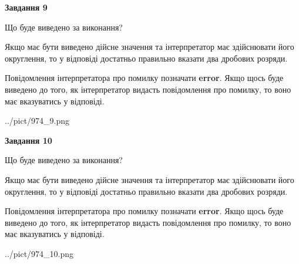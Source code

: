 \documentclass[12pt, ukrainian]{article}
\begin{document}
{\begin {Large}
{\begin {center}\textbf{Завдання 9}\end {center}}\par
Що буде виведено за виконання? \par

Якщо має бути виведено дійсне значення та інтерпретатор має здійснювати його округлення, 
то у відповіді достатньо правильно вказати два дробових розряди.

Повідомлення інтерпретатора про помилку позначати \textbf{error}.
Якщо щось буде виведено до того, як інтерпретатор видасть повідомлення про помилку, 
то воно має вказуватись у відповіді. \par

\begin{center}
	{../pict/974_9.png}
\end{center}
\newpage

{\begin {center}\textbf{Завдання 10}\end {center}}\par
Що буде виведено за виконання? \par

Якщо має бути виведено дійсне значення та інтерпретатор має здійснювати його округлення, 
то у відповіді достатньо правильно вказати два дробових розряди.

Повідомлення інтерпретатора про помилку позначати \textbf{error}.
Якщо щось буде виведено до того, як інтерпретатор видасть повідомлення про помилку, 
то воно має вказуватись у відповіді. \par

\begin{center}
	{../pict/974_10.png}
\end{center}
\newpage

\end {Large}}
\end{document}
